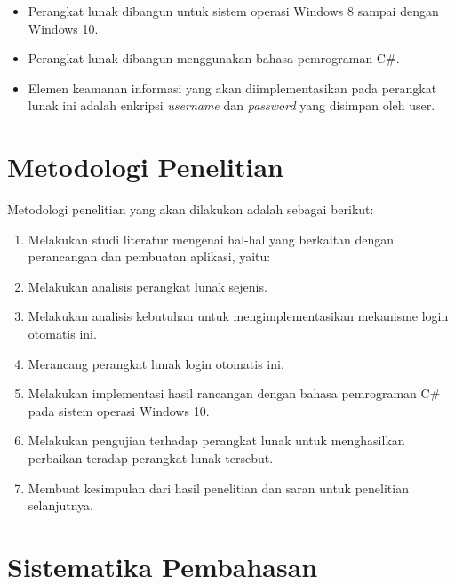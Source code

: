 \begin{itemize}
	\item{Perangkat lunak dibangun untuk sistem operasi Windows 8 sampai dengan Windows 10.}
    \item{Perangkat lunak dibangun menggunakan bahasa pemrograman C\#.}
	\item{Elemen keamanan informasi yang akan diimplementasikan pada perangkat lunak ini adalah enkripsi \textit{username} dan \textit{password} yang disimpan oleh user.}
\end{itemize}



\section{Metodologi Penelitian}
\label{sec:metodologi_penelitian}

Metodologi penelitian yang akan dilakukan adalah sebagai berikut:

\begin{enumerate}
    \item{Melakukan studi literatur mengenai hal-hal yang berkaitan dengan perancangan dan pembuatan aplikasi, yaitu:}
    \item{Melakukan analisis perangkat lunak sejenis.}
    \item{Melakukan analisis kebutuhan untuk mengimplementasikan mekanisme login otomatis ini.}
    \item{Merancang perangkat lunak login otomatis ini.}
    \item{Melakukan implementasi hasil rancangan dengan bahasa pemrograman C\# pada sistem operasi Windows 10.}
    \item{Melakukan pengujian terhadap perangkat lunak untuk menghasilkan perbaikan teradap perangkat lunak tersebut.}
    \item{Membuat kesimpulan dari hasil penelitian dan saran untuk penelitian selanjutnya.}
\end{enumerate}


\section{Sistematika Pembahasan}
\label{sec:sistematika_pembahasan}

